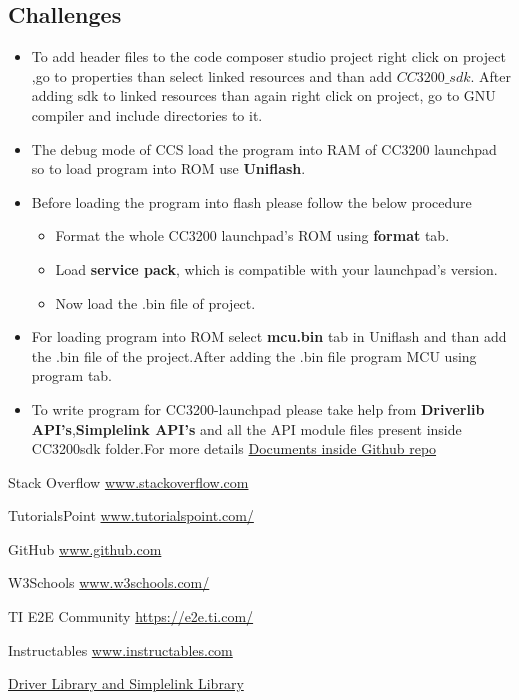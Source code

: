 \documentclass[a4paper,12pt,oneside]{book}
\begin{document}
\subsection*{Challenges}
\begin{itemize}
	\item To add header files to the code composer studio project right click on project ,go to properties than select linked resources and than add $CC3200\_sdk$. After adding sdk to linked resources than again right click on project, go to GNU compiler and include directories to it.
	\item The debug mode of CCS load the program into RAM of CC3200 launchpad so to load program into ROM use \textbf{Uniflash}.
	\item Before loading the program into flash please follow the below procedure
	\begin{itemize}
		\item Format the whole CC3200 launchpad's ROM using \textbf{format} tab.
		\item Load \textbf{service pack}, which is compatible with your launchpad's version.
		\item Now load the .bin file of project. 
	\end{itemize} 
	\item For loading program into ROM select \textbf{mcu.bin} tab in Uniflash and than add the .bin file of the project.After adding the .bin file program MCU using program tab.
	\item To write program for CC3200-launchpad please take help from \textbf{Driverlib API's},\textbf{Simplelink API's} and all the API module files present inside CC3200sdk folder.For more details \href{https://github.com/eYSIP-2016/eYSIP2016-GHPowerMonitoring/tree/master/Documents/CC3200\%20doc}{Documents inside Github repo }
	   
\end{itemize}

\begin{thebibliography}{li}
		\item{Stack Overflow  \href{www.stackoverflow.com}{www.stackoverflow.com}}
		\item{TutorialsPoint  \href{tutorialspoint.com/}{www.tutorialspoint.com/}}
		\item{GitHub  \href{github.com}{www.github.com}}
		\item{W3Schools  \href{http://www.w3schools.com/}{www.w3schools.com/}}
		\item{TI E2E Community \href{TI E2E Community}{	https://e2e.ti.com/}}
		\item{Instructables \href{www.Instructables .com}{www.instructables.com}}
		\item\href{https://github.com/eYSIP-2016/eYSIP2016-GHPowerMonitoring/tree/master/Documents}{Driver Library and Simplelink Library}{\label{50}}
		
\end{thebibliography}
\end{document}
